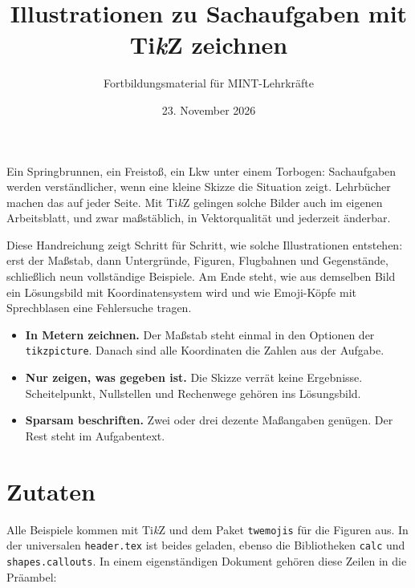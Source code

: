 



\title{Illustrationen zu Sachaufgaben mit Ti\textit{k}Z zeichnen}
\author{Fortbildungsmaterial für MINT-Lehrkräfte}
\date{23. November 2026}
\pagestyle{plain}
\setlength{\parskip}{1.5em} %
\setlength{\emergencystretch}{2em} %




\maketitle

Ein Springbrunnen, ein Freistoß, ein Lkw unter einem Torbogen: Sachaufgaben werden verständlicher, wenn eine kleine Skizze die Situation zeigt. Lehrbücher machen das auf jeder Seite. Mit Ti\textit{k}Z gelingen solche Bilder auch im eigenen Arbeitsblatt, und zwar maßstäblich, in Vektorqualität und jederzeit änderbar.

Diese Handreichung zeigt Schritt für Schritt, wie solche Illustrationen entstehen: erst der Maßstab, dann Untergründe, Figuren, Flugbahnen und Gegenstände, schließlich neun vollständige Beispiele. Am Ende steht, wie aus demselben Bild ein Lösungsbild mit Koordinatensystem wird und wie Emoji-Köpfe mit Sprechblasen eine Fehlersuche tragen.

\begin{hinweis}
\begin{itemize}
	\item \textbf{In Metern zeichnen.} Der Maßstab steht einmal in den Optionen der \texttt{tikzpicture}. Danach sind alle Koordinaten die Zahlen aus der Aufgabe.
	\item \textbf{Nur zeigen, was gegeben ist.} Die Skizze verrät keine Ergebnisse. Scheitelpunkt, Nullstellen und Rechenwege gehören ins Lösungsbild.
	\item \textbf{Sparsam beschriften.} Zwei oder drei dezente Maßangaben genügen. Der Rest steht im Aufgabentext.
\end{itemize}
\end{hinweis}



\section{Zutaten}

Alle Beispiele kommen mit Ti\textit{k}Z und dem Paket \texttt{twemojis} für die Figuren aus. In der universalen \texttt{header.tex} ist beides geladen, ebenso die Bibliotheken \texttt{calc} und \texttt{shapes.callouts}. In einem eigenständigen Dokument gehören diese Zeilen in die Präambel:

